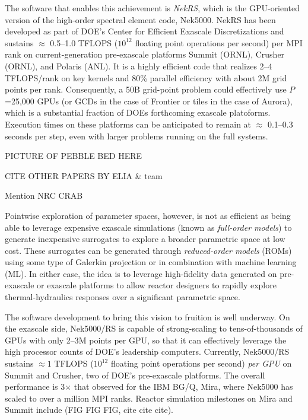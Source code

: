 The software that enables this achievement is {\em NekRS}, which is the
GPU-oriented version of the high-order spectral element code, Nek5000.  
NekRS has been developed as part of DOE's Center for Efficient Exascale
Discretizations and sustains $\approx$ 0.5--1.0 TFLOPS ($10^{12}$ floating
point operations per second) per MPI rank on current-generation pre-exascale
platforms Summit (ORNL), Crusher (ORNL), and Polaris (ANL).  It is a highly
efficient code that realizes 2--4 TFLOPS/rank on key kernels and 80\% 
parallel efficiency with about 2M grid points per rank.  Consequently,
a 50B grid-point problem could effectively use $P$=25,000 GPUs (or GCDs
in the case of Frontier or tiles in the case of Aurora), which is a substantial
fraction of DOEs forthcoming exascale platoforms.  Execution times on these
platforms can be anticipated to remain at $\approx$ 0.1--0.3 seconds per
step, even with larger problems running on the full systems.




PICTURE OF PEBBLE BED HERE

CITE OTHER PAPERS BY ELIA \& team

Mention NRC CRAB

Pointwise exploration of parameter spaces, however, is not as efficient as being
able to leverage expensive exascale simulations (known as {\em full-order
models}) to generate inexpensive surrogates to explore a broader parametric
space at low cost.    These surrogates can be generated through {\em reduced-order
models} (ROMs) using some type of Galerkin projection or in combination with
machine learning (ML).   In either case, the idea is to leverage high-fidelity
data generated on pre-exascale or exascale platforms to allow reactor designers
to rapidly explore thermal-hydraulics responses over a significant parametric
space.

The software development to bring this vision to fruition is well underway.
On the exascale side, Nek5000/RS is capable of strong-scaling to tens-of-thousands
of GPUs with only 2--3M points per GPU, so that it can effectively leverage
the high processor counts of DOE's leadership computers.  Currently, Nek5000/RS
sustains $\approx 1$ TFLOPS ($10^{12}$ floating point operations per second)
{\em per GPU} on Summit and Crusher, two of DOE's pre-exascale platforms.
The overall performance is 3$\times$ that observed for the IBM BG/Q, Mira,
where Nek5000 has scaled to over a million MPI ranks.   Reactor simulation
milestones on Mira and Summit include (FIG FIG FIG, cite cite cite).

